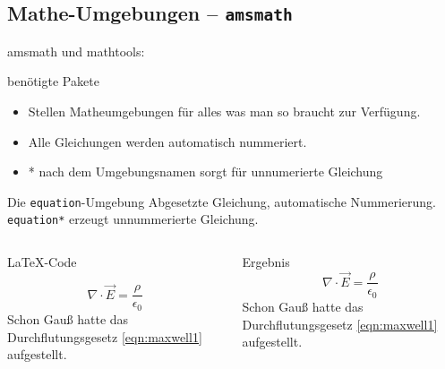 \subsection{Mathe-Umgebungen – \texttt{amsmath}}

\begin{frame}[fragile]{
  amsmath und mathtools:
  \hfill{}
}
  \begin{block}{benötigte Pakete}
    \begin{lstverbatim}
    \usepackage{amsmath}
    \usepackage{amssymb}
    \usepackage{mathtools}
    \end{lstverbatim}
  \end{block}
  \begin{itemize}
      \item Stellen Matheumgebungen für alles was man so braucht zur Verfügung.
      \item Alle Gleichungen werden automatisch nummeriert.
      \item * nach dem Umgebungsnamen sorgt für unnumerierte Gleichung
  \end{itemize}
\end{frame}

\begin{frame}[fragile]{Die \texttt{equation}-Umgebung}
  Abgesetzte Gleichung, automatische Nummerierung. \\
  \texttt{equation*} erzeugt unnummerierte Gleichung.
  \begin{columns}[T, onlytextwidth]
    \begin{column}{0.6\textwidth}
      \begin{block}{\LaTeX-Code}
        \begin{lstverbatim}
        \begin{equation}
          \nabla \cdot \vec{E} =
          \frac{\rho} {\epsilon_0}
          \label{eqn:maxwell1}
        \end{equation}
        Schon Gauß hatte das Durchflutungsgesetz \eqref{eqn:maxwell1} aufgestellt.
        \end{lstverbatim}
      \end{block}
    \end{column}
    \begin{column}{0.35\textwidth}
      \begin{block}{Ergebnis}
        \begin{equation}
          \nabla \cdot \vec{E} =
          \frac{\rho}{\epsilon_0}
          \label{eqn:maxwell1}
        \end{equation}
        Schon Gauß hatte das Durchflutungsgesetz \eqref{eqn:maxwell1} aufgestellt.
      \end{block}
    \end{column}
  \end{columns}
\end{frame}

